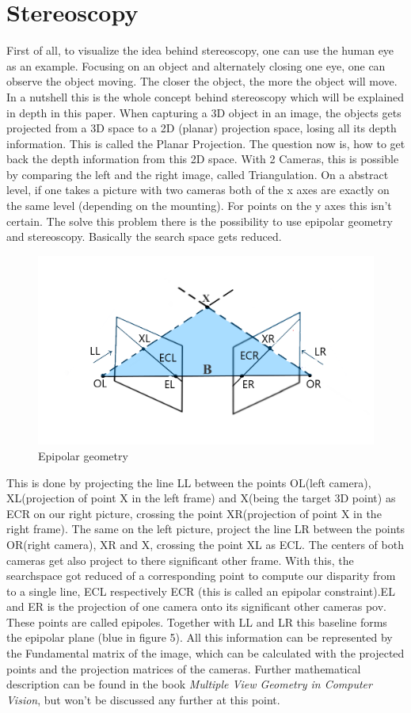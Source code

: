 \documentclass[journal,onecolumn]{IEEEtran}
\begin{document}
\section{Stereoscopy}
\noindent
First of all, to visualize the idea behind stereoscopy, one can use the human eye as an example. Focusing on an object and alternately closing one eye, one can observe the object moving. The closer the object, the more the object will move. In a nutshell this is the whole concept behind stereoscopy which will be explained in depth in this paper.
When capturing a 3D object in an image, the objects gets projected from a 3D space to a 2D (planar) projection space, losing all its depth information. This is called the Planar Projection. The question now is, how to get back the depth information from this 2D space.
With 2 Cameras, this is possible by comparing the left and the right image, called Triangulation.
On a abstract level, if one takes a picture with two cameras both of the x axes are exactly on the same level (depending on the mounting). For points on the y axes this isn't certain. The solve this problem there is the possibility to use epipolar geometry and stereoscopy.
Basically the search space gets reduced.
\begin{figure}[h!]
	\centering
	\includegraphics[scale=0.5]{epipolarGeometry.png}
	\captionsetup{justification=centering}
	\caption{Epipolar geometry}
\end{figure}
This is done by projecting the line LL between the points OL(left camera), XL(projection of point X in the left frame) and X(being the target 3D point) as ECR on our right picture, crossing the point XR(projection of point X in the right frame). The same on the left picture, project the line LR between the points OR(right camera), XR and X, crossing the point XL as ECL. The centers of both cameras get also project to there significant other frame.
With this, the searchspace got reduced of a corresponding point to compute our disparity from to a single line, ECL respectively ECR (this is called an epipolar constraint).EL and ER is the projection of one camera onto its significant other cameras pov. These points are called epipoles. Together with LL and LR this baseline forms the epipolar plane (blue in figure 5). All this information can be represented by the Fundamental matrix of the image, which can be calculated with the projected points and the projection matrices of the cameras. Further mathematical description can be found in the book \emph{Multiple View Geometry in Computer Vision}\cite{hartley_zisserman_2004}, but won't be discussed any further at this point.
\end{document}
